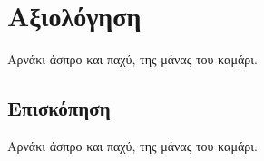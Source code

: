 \chapter{Αξιολόγηση} \label{chapter:gr-evaluation}

Αρνάκι άσπρο και παχύ, της μάνας του καμάρι.

\section{Επισκόπηση} \label{section:gr-evaluation_overview}

Αρνάκι άσπρο και παχύ, της μάνας του καμάρι.